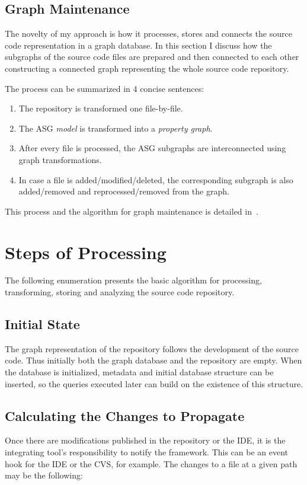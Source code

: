 \subsection{Graph Maintenance}
The novelty of my approach is how it processes, stores and connects the source code representation in a graph database. In this section I discuss how the subgraphs of the source code files are prepared and then connected to each other constructing a connected graph representing the whole source code repository.

The process can be summarized in 4 concise sentences:
\begin{enumerate}[topsep=0pt]
  \item The repository is transformed one file-by-file.
  \item The ASG \emph{model} is transformed into a \emph{property graph}.
  \item After every file is processed, the ASG subgraphs are interconnected using graph transformations.
  \item In case a file is added/modified/deleted, the corresponding subgraph is also added/removed and reprocessed/removed from the graph.
\end{enumerate}

This process and the algorithm for graph maintenance is detailed in~.


\section{Steps of Processing}
The following enumeration presents the basic algorithm for processing, transforming, storing and analyzing the source code repository.

\subsection{Initial State}
The graph representation of the repository follows the development of the source code. Thus initially both the graph database and the repository are empty. When the database is initialized, metadata and initial database structure can be inserted, so the queries executed later can build on the existence of this structure.

\subsection{Calculating the Changes to Propagate}
Once there are modifications published in the repository or the IDE, it is the integrating tool's responsibility to notify the framework. This can be an event hook for the IDE or the CVS, for example. The changes to a file at a given path may be the following:

